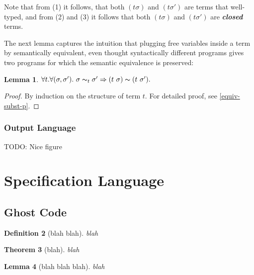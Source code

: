 \documentclass[a4paper,11pt,oneside]{article}
\theoremstyle{plain}
\newtheorem{definition}{Definition}[subsection]
\newtheorem{lemma}[definition]{Lemma}
\newtheorem{theorem}[definition]{Theorem}
\newcommand{\tmapp}[2]{(#1 ~ #2)}
\newcommand{\eqvsbst}[2]{#1 \thicksim_{#2} #1'}
\begin{document}
	Note that from (1) it follows, that both $(t\sigma)$ and 
	$(t\sigma')$ are terms that well-typed, and from (2) and (3) it follows 
	that both $(t\sigma)$ and	 $(t\sigma')$ are \textit{\textbf{closed}} terms.
	
	The next lemma captures the intuition that plugging free variables
        inside a term by semantically equivalent, even thought syntactically
        different programs gives two programs for which the semantic
        equivalence is preserved:
	
	\begin{lemma} 
		$\forall t. \forall (\sigma, \sigma'). ~\eqvsbst{\sigma}{t}
		\Rightarrow \tmapp{t}{\sigma} \thicksim \tmapp{t}{\sigma'}.$ 
	\label{equiv-subst-l}
	\end{lemma}

	\begin{proof}
		By induction on the structure of term $t$. For detailed proof, see
		\ref{equiv-subst-p}.
	\end{proof}


\subsubsection*{Output Language}
TODO: Nice figure 


\newpage
\section{Specification Language}

\subsection{Ghost Code}

\begin{definition}[blah blah] blah
\end{definition}

\begin{theorem}[blah] 
blah
\end{theorem}

\begin{lemma}[blah blah blah]
blah
\end{lemma}
\end{document}
